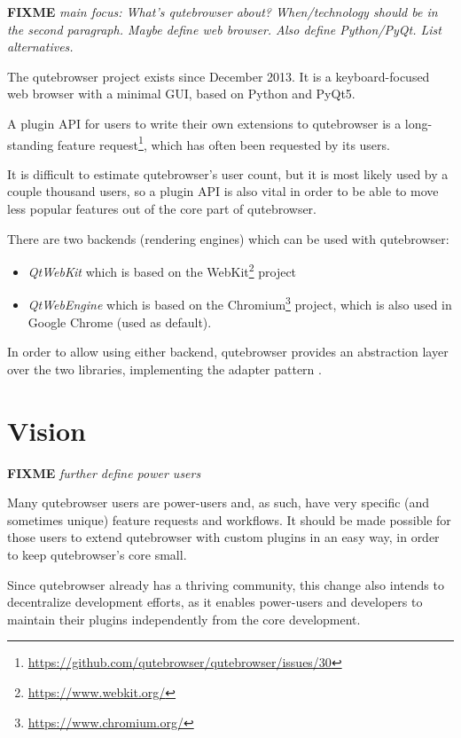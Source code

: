 \documentclass[a4paper,parskip=full]{scrreprt}
\newcommand{\fixme}[1]{\textbf{FIXME} \emph{#1}}
\begin{document}
\fixme{main focus: What's qutebrowser about? When/technology should be in the
  second paragraph. Maybe define web browser. Also define Python/PyQt. List
alternatives.}

The qutebrowser project exists since December 2013. It is a keyboard-focused
web browser with a minimal GUI, based on Python and PyQt5.

A plugin API for users to write their own extensions to qutebrowser is a
long-standing feature
request\footnote{\url{https://github.com/qutebrowser/qutebrowser/issues/30}},
which has often been requested by its users.

It is difficult to estimate qutebrowser's user count, but it is most likely used by a
couple thousand users, so a plugin API is also vital in order to be able to move
less popular features out of the core part of qutebrowser.

There are two backends (rendering engines) which can be used with qutebrowser:

\begin{itemize}
  \item \emph{QtWebKit} which is based on the
  WebKit\footnote{\url{https://www.webkit.org/}} project
  \item \emph{QtWebEngine} which is based on the
  Chromium\footnote{\url{https://www.chromium.org/}} project, which is also used
  in Google Chrome (used as default).
\end{itemize}

In order to allow using either backend, qutebrowser provides an abstraction
layer over the two libraries, implementing the adapter pattern
\citep[p.~139ff]{gof}.

\section{Vision}
\label{vision}

\fixme{further define power users}

Many qutebrowser users are power-users and, as such, have very specific (and
sometimes unique) feature requests and workflows. It should be made possible for
those users to extend qutebrowser with custom plugins in an easy way, in order
to keep qutebrowser's core small.

Since qutebrowser already has a thriving community, this change also intends to
decentralize development efforts, as it enables power-users and
developers to maintain their plugins independently from the core development.
\end{document}
